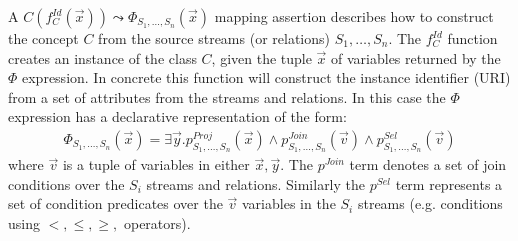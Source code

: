 A $C(f_C^{Id}(\vec{x})) \leadsto \Phi_{S_1,\ldots,S_n}(\vec{x})$ mapping assertion describes how to construct the concept $C$ from the source streams (or relations) $S_1,\ldots,S_n$. The $f_C^{Id}$ function creates an instance of the class $C$, given the tuple $\vec{x}$ of variables returned by the $\Phi$ expression. In concrete this function will construct the instance identifier (URI) from a set of attributes from the streams and relations.
In this case the $\Phi$ expression has a declarative representation of the form:
\begin{align*}
\Phi_{S_1,\ldots,S_n}(\vec{x})= \exists\vec{y}.p^{Proj}_{S_1,\ldots,S_n}(\vec{x}) \wedge p^{Join}_{S_1,\ldots,S_n}(\vec{v}) \wedge p_{S_1,\ldots,S_n}^{Sel}(\vec{v})
\end{align*}
where $\vec{v}$ is a tuple of variables in either $\vec{x},\vec{y}$. The $p^{Join}$ term denotes a set of join conditions over the $S_i$ streams and relations. Similarly the $p^{Sel}$ term represents a set of condition predicates over the $\vec{v}$ variables in the $S_i$ streams (e.g. conditions using $<,\leq,\geq,$ operators).
\\
%

